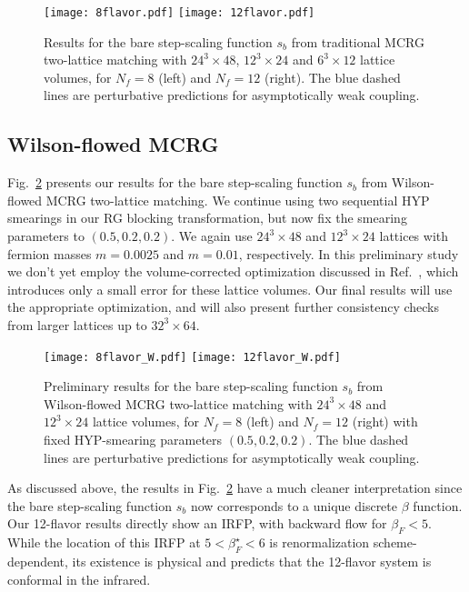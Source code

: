\documentclass{PoS}
\newcommand{\be}{\ensuremath{\beta} }
\newcommand{\X}{\ensuremath{\!\times\!} }
\newcommand{\refcite}[1]{Ref.~\cite{#1}}
\newcommand{\fig}[1]{Fig.~\ref{#1}}
\begin{document}
\begin{figure}[htpb]
  \texttt{[image: 8flavor.pdf]}\hfill
  \texttt{[image: 12flavor.pdf]}
  \caption{Results for the bare step-scaling function $s_b$ from traditional MCRG two-lattice matching with $24^3\X48$, $12^3\X24$ and $6^3\X12$ lattice volumes, for $N_f = 8$ (left) and $N_f = 12$ (right).  The blue dashed lines are perturbative predictions for asymptotically weak coupling.}
  \label{fig:MCRG}
\end{figure}



\subsection{\label{sec:WMCRGresults}Wilson-flowed MCRG} %
\fig{fig:WMCRG} presents our results for the bare step-scaling function $s_b$ from Wilson-flowed MCRG two-lattice matching.
We continue using two sequential HYP smearings in our RG blocking transformation, but now fix the smearing parameters to $(0.5, 0.2, 0.2)$.
We again use $24^3\X48$ and $12^3\X24$ lattices with fermion masses $m = 0.0025$ and $m = 0.01$, respectively.
In this preliminary study we don't yet employ the volume-corrected optimization discussed in \refcite{Hasenfratz:2011xn}, which introduces only a small error for these lattice volumes.
Our final results will use the appropriate optimization, and will also present further consistency checks from larger lattices up to $32^3\X64$.

\begin{figure}[htpb]
  \texttt{[image: 8flavor\_W.pdf]}\hfill
  \texttt{[image: 12flavor\_W.pdf]}
  \caption{Preliminary results for the bare step-scaling function $s_b$ from Wilson-flowed MCRG two-lattice matching with $24^3\X48$ and $12^3\X24$ lattice volumes, for $N_f = 8$ (left) and $N_f = 12$ (right) with fixed HYP-smearing parameters $(0.5, 0.2, 0.2)$.  The blue dashed lines are perturbative predictions for asymptotically weak coupling.}
  \label{fig:WMCRG}
\end{figure}

As discussed above, the results in \fig{fig:WMCRG} have a much cleaner interpretation since the bare step-scaling function $s_b$ now corresponds to a unique discrete \be function.
Our 12-flavor results directly show an IRFP, with backward flow for $\be_F < 5$.
While the location of this IRFP at $5 < \be_F^{\star} < 6$ is renormalization scheme-dependent, its existence is physical and predicts that the 12-flavor system is conformal in the infrared.
\end{document}
